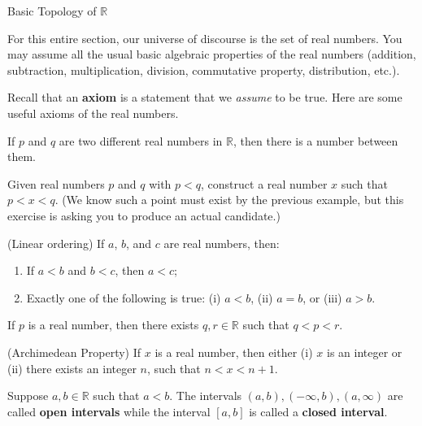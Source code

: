 \begin{section}{Basic Topology of $\mathbb{R}$}

\begin{remark}
For this entire section, our universe of discourse is the set of real numbers.  You may assume all the usual basic algebraic properties of the real numbers (addition, subtraction, multiplication, division, commutative property, distribution, etc.).
\end{remark}

Recall that an \textbf{axiom} is a statement that we \emph{assume} to be true.  Here are some useful axioms of the real numbers.

\begin{axiom} 
If $p$ and $q$ are two different real numbers in $\mathbb{R}$, then there is a number between them.
\end{axiom}

\begin{exercise}
Given real numbers $p$ and $q$ with $p<q$, construct a real number $x$ such that $p<x<q$.  (We know such a point must exist by the previous example, but this exercise is asking you to produce an actual candidate.)
\end{exercise}

\begin{axiom}
(Linear ordering) If $a$, $b$, and $c$ are real numbers, then:
\begin{enumerate}
\item If $a < b$ and $b<c$, then $a<c$;
\item Exactly one of the following is true: (i) $a < b$, (ii) $a=b$, or (iii) $a>b$.
\end{enumerate}
\end{axiom}

\begin{axiom}
If $p$ is a real number, then there exists $q,r\in\mathbb{R}$ such that $q<p<r$.
\end{axiom}

\begin{axiom}
(Archimedean Property) If $x$ is a real number, then either (i) $x$ is an integer or (ii) there exists an integer $n$, such that $n<x<n+1$. 
\end{axiom}

\begin{definition}
Suppose $a,b\in\mathbb{R}$ such that $a<b$.  The intervals $(a,b), (-\infty,b), (a,\infty)$ are called \textbf{open intervals} while the interval $[a,b]$ is called a \textbf{closed interval}.
\end{definition}


\end{section}

